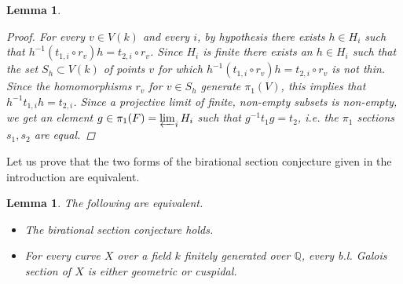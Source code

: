 \documentclass[11pt]{amsart}
\theoremstyle{plain}
\newtheorem{lemma}[theorem]{Lemma}
\theoremstyle{definition}
\newcommand{\on}{\operatorname}
\newcommand{\1}{\mathbb{1}}
\newcommand{\gal}{\on{Gal}}
\newcommand{\Q}{\mathbb{Q}}
\newcommand{\s}{\subseteq}
\renewcommand{\P}{\mathbb{P}}
\renewcommand{\projlim}{\varprojlim}
\begin{document}
\begin{lemma}
\begin{proof}
		For every $v\in V(k)$ and every $i$, by hypothesis there exists $h\in H_{i}$ such that $h^{-1}(t_{1,i}\circ r_{v})h=t_{2,i}\circ r_{v}$. Since $H_{i}$ is finite there exists an $h\in H_{i}$ such that the set $S_{h}\subset V(k)$ of points $v$ for which $h^{-1}(t_{1,i}\circ r_{v})h=t_{2,i}\circ r_{v}$ is not thin. Since the homomorphisms $r_{v}$ for $v\in S_{h}$ generate $\pi_{1}(V)$, this implies that $h^{-1}t_{1,i}h=t_{2,i}$.	Since a projective limit of finite, non-empty subsets is non-empty, we get an element $g\in\pi_{1}(F)=\projlim_{i}H_{i}$ such that $g^{-1}t_{1}g=t_{2}$, i.e. the $\pi_{1}$ sections $s_{1},s_{2}$ are equal.
	\end{proof}
\end{lemma}




Let us prove that the two forms of the birational section conjecture given in the introduction are equivalent.

\begin{lemma}\label{bireq}
    The following are equivalent.
    \begin{itemize}
        \item The birational section conjecture holds.
        \item For every curve $X$ over a field $k$ finitely generated over $\Q$, every b.l. Galois section of $X$ is either geometric or cuspidal.
    \end{itemize}
\end{lemma}
\end{document}
